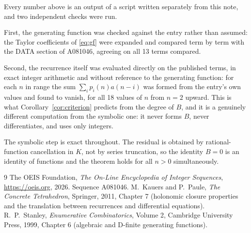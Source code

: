 \documentclass[11pt,a4paper]{article}
\theoremstyle{plain}
\theoremstyle{definition}
\begin{document}
Every number above is an output of a script written separately from this note, and two
independent checks were run.

First, the generating function was checked against the entry rather than assumed: the
Taylor coefficients of \eqref{eq:gf} were expanded and compared term by term with the DATA
section of A081046, agreeing on all 13 terms compared.

Second, the recurrence itself was evaluated directly on the published terms, in exact
integer arithmetic and without reference to the generating function: for each $n$ in range
the sum $\sum_{i}p_{i}(n)a(n-i)$ was formed from the entry's own values and found to
vanish, for all 18 values of $n$ from $n=2$ upward. This is what
Corollary~\ref{cor:criterion} predicts from the degree of $B$, and it is a genuinely
different computation from the symbolic one: it never forms $B$, never differentiates, and
uses only integers.

The symbolic step is exact throughout. The residual is obtained by rational-function
cancellation in $K$, not by series truncation, so the identity $B=0$ is an
identity of functions and the theorem holds for all $n>0$ simultaneously.

\begin{thebibliography}{9}
 The OEIS Foundation, \emph{The On-Line Encyclopedia of Integer Sequences},
\url{https://oeis.org}, 2026. Sequence A081046.
 M.~Kauers and P.~Paule, \emph{The Concrete Tetrahedron}, Springer, 2011,
Chapter 7 (holonomic closure properties and the translation between recurrences and
differential equations).
 R.~P.~Stanley, \emph{Enumerative Combinatorics}, Volume 2, Cambridge
University Press, 1999, Chapter 6 (algebraic and D-finite generating functions).
\end{thebibliography}
\end{document}
